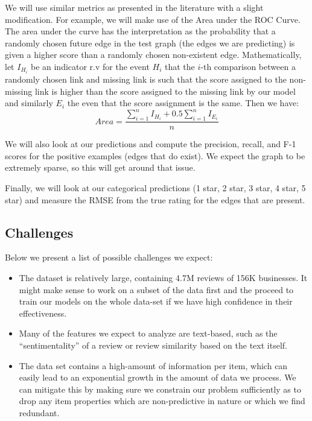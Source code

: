 \documentclass[letterpaper, 11 pt, conference]{ieeeconf}  %
\begin{document}
We will use similar metrics as presented in the literature with a slight modification. For example, we will make use of the Area under the ROC Curve. The area under the curve has the interpretation as the probability that a randomly chosen future edge in the test graph (the edges we are predicting) is given a higher score than a randomly chosen non-existent edge. Mathematically, let $I_{H_i}$ be an indicator r.v for the event $H_i$ that the $i$-th comparison between a randomly chosen link and missing link is such that the score assigned to the non-missing link is higher than the score assigned to the missing link by our model and similarly $E_i$ the even that the score assignment is the same. Then we have:
$$
Area = \frac{\sum_{i=1}^n I_{H_i} + 0.5 \sum_{i=1}^n I_{E_i}}{n}
$$

We will also look at our predictions and compute the precision, recall, and F-1 scores for the positive examples (edges that do exist). We expect the graph to be extremely sparse, so this will get around that issue.

Finally, we will look at our categorical predictions (1 star, 2 star, 3 star, 4 star, 5 star) and measure the RMSE from the true rating for the edges that are present.

\subsection{Challenges}

Below we present a list of possible challenges we expect:

\begin{itemize}
\item The dataset is relatively large, containing 4.7M reviews of 156K businesses. It might make sense to work on a subset of the data first and the proceed to train our models on the whole data-set if we have high confidence in their effectiveness.
\item Many of the features we expect to analyze are text-based, such as the ``sentimentality'' of a review or review similarity based on the text itself. 
\item The data set contains a high-amount of information per item, which can easily lead to an exponential growth in the amount of data we process. We can mitigate this by making sure we constrain our problem sufficiently as to drop any item properties which are non-predictive in nature or which we find redundant.
\end{itemize}

{}

\end{document}

